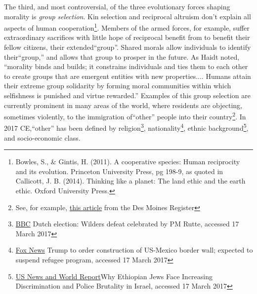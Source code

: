 The third, and most controversial, of the three evolutionary forces shaping morality is \emph{group selection}. Kin selection and reciprocal altruism don't explain all aspects of human cooperation\footnote{Bowles, S., \& Gintis, H. (2011). A cooperative species: Human reciprocity and its evolution. Princeton University Press, pg 198-9, as quoted in Callicott, J. B. (2014). Thinking like a planet: The land ethic and the earth ethic. Oxford University Press.}. Members of the armed forces, for example, suffer extraordinary sacrifices with little hope of reciprocal benefit from to benefit their fellow citizens, their extended``group''. Shared morals allow individuals to identify their``group,'' and allows that group to prosper in the future. As Haidt noted, ``morality
binds and builds; it constrains individuals and ties them to each other to create groups that are emergent entities with new properties.... Humans attain their extreme group solidarity by forming moral communities within which selfishness is punished and virtue rewarded.'' Examples of this group selection are currently prominent in many areas of the world, where residents are objecting, sometimes violently, to the immigration of``other'' people into their country\footnote{See, for example, \href{http://www.desmoinesregister.com/story/news/politics/2017/03/13/iowa-gop-chair-jeff-kaufmann-condemns-steve-king-our-civilization-tweet/99116748/} {this article} from the Des Moines Register}. In 2017 CE,``other'' has been defined by religion\footnote{\href{http://www.bbc.com/news/world-europe-39287689}{BBC} Dutch election: Wilders defeat celebrated by PM Rutte, accessed 17 March 2017}, nationality\footnote{\href{http://www.foxnews.com/politics/2017/01/25/trump-to-order-construction-us-mexican-border-wall-reportedly-to-suspend-refugee-program.html}{Fox News} Trump to order construction of US-Mexico border wall; expected to suspend refugee program, accessed 17 March 2017}, ethnic background\footnote{\href{http://www.newsweek.com/2016/10/07/why-ethiopian-jews-israel-face-discrimination-racism-police-brutality-502697.html}{US News and World Report}Why Ethiopian Jews Face Increasing Discrimination and Police Brutality in Israel, accessed 17 March 2017}, and socio-economic class.
  
